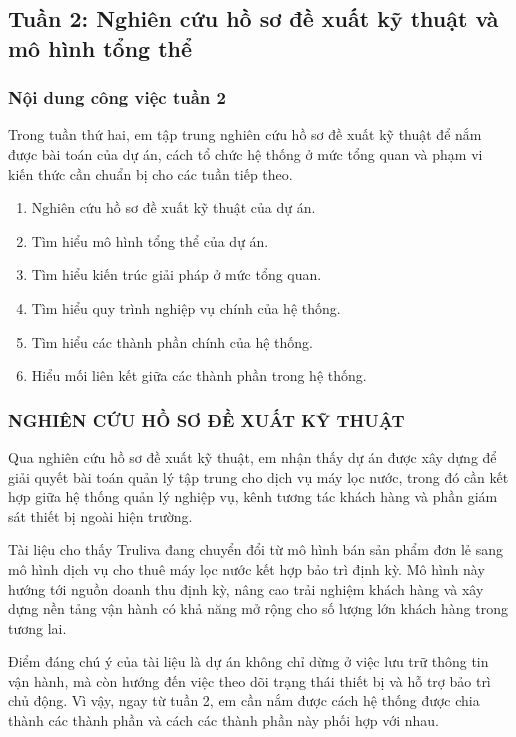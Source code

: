 \subsection{Tuần 2: Nghiên cứu hồ sơ đề xuất kỹ thuật và mô hình tổng thể}

\subsubsection{Nội dung công việc tuần 2}
Trong tuần thứ hai, em tập trung nghiên cứu hồ sơ đề xuất kỹ thuật để nắm được bài toán của dự án, cách tổ chức hệ thống ở mức tổng quan và phạm vi kiến thức cần chuẩn bị cho các tuần tiếp theo.

\begin{enumerate}
    \item Nghiên cứu hồ sơ đề xuất kỹ thuật của dự án.
    \item Tìm hiểu mô hình tổng thể của dự án.
    \item Tìm hiểu kiến trúc giải pháp ở mức tổng quan.
    \item Tìm hiểu quy trình nghiệp vụ chính của hệ thống.
    \item Tìm hiểu các thành phần chính của hệ thống.
    \item Hiểu mối liên kết giữa các thành phần trong hệ thống.
\end{enumerate}

\subsubsection{NGHIÊN CỨU HỒ SƠ ĐỀ XUẤT KỸ THUẬT}


Qua nghiên cứu hồ sơ đề xuất kỹ thuật, em nhận thấy dự án được xây dựng để giải quyết bài toán quản lý tập trung cho dịch vụ máy lọc nước, trong đó cần kết hợp giữa hệ thống quản lý nghiệp vụ, kênh tương tác khách hàng và phần giám sát thiết bị ngoài hiện trường.

Tài liệu cho thấy Truliva đang chuyển đổi từ mô hình bán sản phẩm đơn lẻ sang mô hình dịch vụ cho thuê máy lọc nước kết hợp bảo trì định kỳ. Mô hình này hướng tới nguồn doanh thu định kỳ, nâng cao trải nghiệm khách hàng và xây dựng nền tảng vận hành có khả năng mở rộng cho số lượng lớn khách hàng trong tương lai.

Điểm đáng chú ý của tài liệu là dự án không chỉ dừng ở việc lưu trữ thông tin vận hành, mà còn hướng đến việc theo dõi trạng thái thiết bị và hỗ trợ bảo trì chủ động. Vì vậy, ngay từ tuần 2, em cần nắm được cách hệ thống được chia thành các thành phần và cách các thành phần này phối hợp với nhau.

